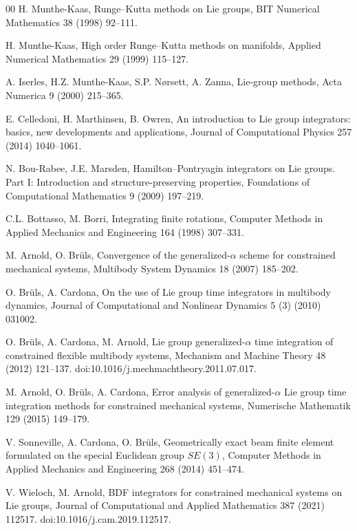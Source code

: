 \begin{thebibliography}{00}
H. Munthe-Kaas,
Runge--Kutta methods on Lie groups,
BIT Numerical Mathematics 38 (1998) 92--111.

H. Munthe-Kaas,
High order Runge--Kutta methods on manifolds,
Applied Numerical Mathematics 29 (1999) 115--127.

A. Iserles, H.Z. Munthe-Kaas, S.P. N{\o}rsett, A. Zanna,
Lie-group methods,
Acta Numerica 9 (2000) 215--365.

E. Celledoni, H. Marthinsen, B. Owren,
An introduction to Lie group integrators: basics, new developments and applications,
Journal of Computational Physics 257 (2014) 1040--1061.

N. Bou-Rabee, J.E. Marsden,
Hamilton--Pontryagin integrators on Lie groups. Part I: Introduction and structure-preserving
properties,
Foundations of Computational Mathematics 9 (2009) 197--219.

C.L. Bottasso, M. Borri,
Integrating finite rotations,
Computer Methods in Applied Mechanics and Engineering 164 (1998) 307--331.

M. Arnold, O. Br\"uls,
Convergence of the generalized-$\alpha$ scheme for constrained mechanical systems,
Multibody System Dynamics 18 (2007) 185--202.

O. Br\"uls, A. Cardona,
On the use of Lie group time integrators in multibody dynamics,
Journal of Computational and Nonlinear Dynamics 5 (3) (2010) 031002.

O. Br\"uls, A. Cardona, M. Arnold,
Lie group generalized-$\alpha$ time integration of constrained flexible multibody systems,
Mechanism and Machine Theory 48 (2012) 121--137.
doi:10.1016/j.mechmachtheory.2011.07.017.

M. Arnold, O. Br\"uls, A. Cardona,
Error analysis of generalized-$\alpha$ Lie group time integration methods for constrained
mechanical systems,
Numerische Mathematik 129 (2015) 149--179.

V. Sonneville, A. Cardona, O. Br\"uls,
Geometrically exact beam finite element formulated on the special Euclidean group $SE(3)$,
Computer Methods in Applied Mechanics and Engineering 268 (2014) 451--474.

V. Wieloch, M. Arnold,
BDF integrators for constrained mechanical systems on Lie groups,
Journal of Computational and Applied Mathematics 387 (2021) 112517.
doi:10.1016/j.cam.2019.112517.


\end{thebibliography}
